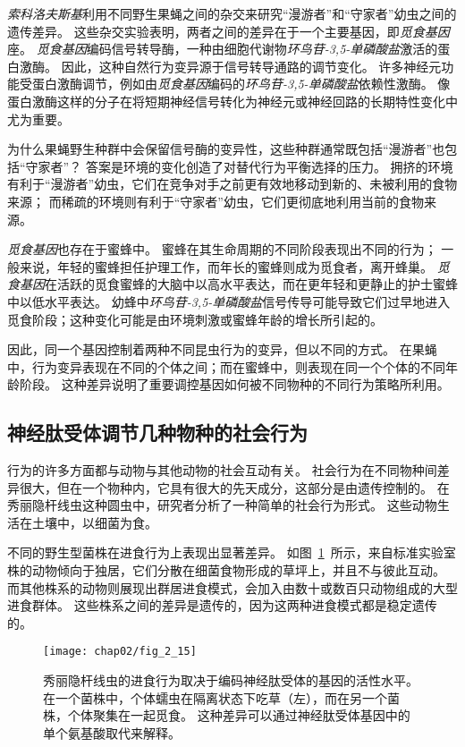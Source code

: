 \textit{索科洛夫斯基}利用不同野生果蝇之间的杂交来研究“漫游者”和“守家者”幼虫之间的遗传差异。
这些杂交实验表明，两者之间的差异在于一个主要基因，即\textit{觅食基因}座。
\textit{觅食基因}编码信号转导酶，一种由细胞代谢物\textit{环鸟苷-3,5-单磷酸盐}激活的蛋白激酶。
因此，这种自然行为变异源于信号转导通路的调节变化。
许多神经元功能受蛋白激酶调节，例如由\textit{觅食基因}编码的\textit{环鸟苷-3,5-单磷酸盐}依赖性激酶。
像蛋白激酶这样的分子在将短期神经信号转化为神经元或神经回路的长期特性变化中尤为重要。


为什么果蝇野生种群中会保留信号酶的变异性，这些种群通常既包括“漫游者”也包括“守家者”？
答案是环境的变化创造了对替代行为平衡选择的压力。 
拥挤的环境有利于“漫游者”幼虫，它们在竞争对手之前更有效地移动到新的、未被利用的食物来源；
而稀疏的环境则有利于“守家者”幼虫，它们更彻底地利用当前的食物来源。


\textit{觅食基因}也存在于蜜蜂中。
蜜蜂在其生命周期的不同阶段表现出不同的行为；
一般来说，年轻的蜜蜂担任护理工作，而年长的蜜蜂则成为觅食者，离开蜂巢。
\textit{觅食基因}在活跃的觅食蜜蜂的大脑中以高水平表达，而在更年轻和更静止的护士蜜蜂中以低水平表达。
幼蜂中\textit{环鸟苷-3,5-单磷酸盐}信号传导可能导致它们过早地进入觅食阶段；这种变化可能是由环境刺激或蜜蜂年龄的增长所引起的。


因此，同一个基因控制着两种不同昆虫行为的变异，但以不同的方式。
在果蝇中，行为变异表现在不同的个体之间；而在蜜蜂中，则表现在同一个个体的不同年龄阶段。
这种差异说明了重要调控基因如何被不同物种的不同行为策略所利用。



\subsection{神经肽受体调节几种物种的社会行为}

行为的许多方面都与动物与其他动物的社会互动有关。
社会行为在不同物种间差异很大，但在一个物种内，它具有很大的先天成分，这部分是由遗传控制的。
在秀丽隐杆线虫这种圆虫中，研究者分析了一种简单的社会行为形式。
这些动物生活在土壤中，以细菌为食。



不同的野生型菌株在进食行为上表现出显著差异。
如图~\ref{fig:2_15}~所示，来自标准实验室株的动物倾向于独居，它们分散在细菌食物形成的草坪上，并且不与彼此互动。
而其他株系的动物则展现出群居进食模式，会加入由数十或数百只动物组成的大型进食群体。
这些株系之间的差异是遗传的，因为这两种进食模式都是稳定遗传的。






\begin{figure}[htbp]
	\centering
	\texttt{[image: chap02/fig\_2\_15]}
	\caption{秀丽隐杆线虫的进食行为取决于编码神经肽受体的基因的活性水平。
		在一个菌株中，个体蠕虫在隔离状态下吃草（左），而在另一个菌株，个体聚集在一起觅食。
		这种差异可以通过神经肽受体基因中的单个氨基酸取代来解释\cite{de1998natural}。}
	\label{fig:2_15}
\end{figure}


